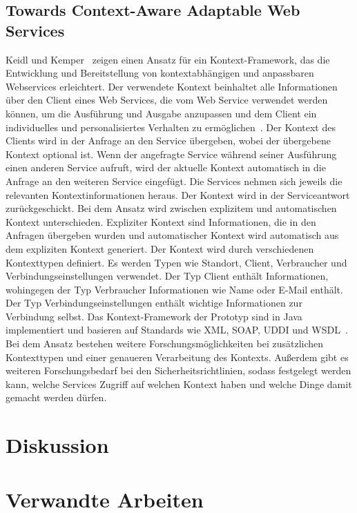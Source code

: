 \documentclass[conference,compsoc]{IEEEtran}
\begin{document}
\subsection{Towards Context-Aware Adaptable Web Services}
Keidl und Kemper~\cite{keidl2004towards} zeigen einen Ansatz für ein Kontext-Framework, das die Entwicklung und Bereitstellung von kontextabhängigen und anpassbaren Webservices erleichtert.
Der verwendete Kontext beinhaltet alle Informationen über den Client eines Web Services, die vom Web Service verwendet werden können, um die Ausführung und Ausgabe anzupassen und dem Client ein individuelles und personalisiertes Verhalten zu ermöglichen~\cite{keidl2004towards}. Der Kontext des Clients wird in der Anfrage an den Service übergeben, wobei der übergebene Kontext optional ist. Wenn der angefragte Service während seiner Ausführung einen anderen Service aufruft, wird der aktuelle Kontext automatisch in die Anfrage an den weiteren Service eingefügt. Die Services nehmen sich jeweils die relevanten Kontextinformationen heraus. Der Kontext wird in der Serviceantwort zurückgeschickt.
Bei dem Ansatz wird zwischen explizitem und automatischen Kontext unterschieden. Expliziter Kontext sind Informationen, die in den Anfragen übergeben wurden und automatischer Kontext wird automatisch aus dem expliziten Kontext generiert.
Der Kontext wird durch verschiedenen Kontexttypen definiert. Es werden Typen wie Standort, Client, Verbraucher und Verbindungseinstellungen verwendet. Der Typ Client enthält Informationen, wohingegen der Typ Verbraucher Informationen wie Name oder E-Mail enthält. Der Typ Verbindungseinstellungen enthält wichtige Informationen zur Verbindung selbst.
Das Kontext-Framework der Prototyp sind in Java implementiert und basieren auf Standards wie XML, SOAP, UDDI und WSDL~\cite{keidl2004towards}.
Bei dem Ansatz bestehen weitere Forschungsmöglichkeiten bei zusätzlichen Kontexttypen und einer genaueren Verarbeitung des Kontexts. Außerdem gibt es weiteren Forschungsbedarf bei den Sicherheitsrichtlinien, sodass festgelegt werden kann, welche Services Zugriff auf welchen Kontext haben und welche Dinge damit gemacht werden dürfen.
\section{Diskussion}

\section{Verwandte Arbeiten}
\end{document}
